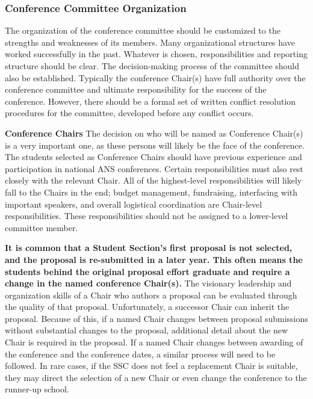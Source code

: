 \documentclass[12pt]{article}
\begin{document}
\subsubsection{Conference Committee Organization}

The organization of the conference committee should be customized to the strengths and
weaknesses of its members. Many organizational structures have worked successfully in the past. Whatever is chosen, responsibilities and reporting structure should be clear. The decision-making process of the committee should also be established. Typically the conference Chair(s) have full authority over the conference committee and ultimate responsibility for the success of the conference. However, there should be a formal set of written conflict resolution procedures for the committee, developed before any conflict occurs.

\textbf{Conference Chairs} The decision on who will be named as Conference Chair(s) is a very important one, as these persons will likely be the face of the conference.
The students selected as Conference Chairs should have previous experience and participation in national ANS conferences.
Certain responsibilities must also rest closely with the relevant Chair. All of the highest-level responsibilities will likely fall to the Chairs in the end; budget management, fundraising, interfacing with important speakers, and overall logistical coordination are Chair-level responsibilities. These responsibilities should not be assigned to a lower-level committee member.

\textbf{It is common that a Student Section’s first proposal is not selected, and the proposal is re-submitted in a later year. This often means the students behind the original proposal effort graduate and require a change in the named conference Chair(s).} The visionary leadership and organization skills of a Chair who authors a proposal can be evaluated through the quality of that proposal. Unfortunately, a successor Chair can inherit the proposal. Because of this, if a named Chair changes between proposal submissions without substantial changes to the proposal, additional detail about the new Chair is required in the proposal. If a named Chair changes between awarding of the conference and the conference dates, a similar process will need to be followed. In rare cases, if the SSC does not feel a replacement Chair is suitable, they may direct the selection of a new Chair or even change the conference to the runner-up school.
\end{document}
